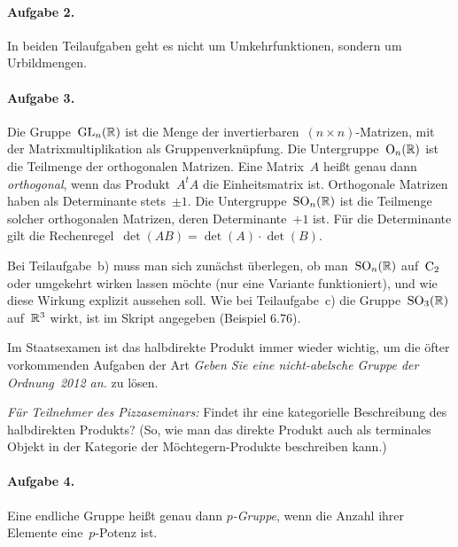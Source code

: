 \documentclass{algblatt}
\newcommand{\hint}[1]{\rotatebox{180}{\vbox{\textcolor{grey}{#1}}}}
\begin{document}
\paragraph{Aufgabe 2.} In beiden Teilaufgaben geht es nicht um
Umkehrfunktionen, sondern um Urbildmengen.

\paragraph{Aufgabe 3.} Die Gruppe~$\mathrm{GL}_n(\mathbb{R})$ ist die Menge der
invertierbaren~$(n \times n)$-Matrizen, mit der Matrixmultiplikation als
Gruppenverknüpfung. Die Untergruppe~$\mathrm{O}_n(\mathbb{R})$ ist die Teilmenge der
orthogonalen Matrizen. Eine Matrix~$A$ heißt genau dann
\emph{orthogonal}, wenn das Produkt~$A^t A$ die
Einheitsmatrix ist. Orthogonale Matrizen haben als Determinante stets~$\pm 1$.
Die Untergruppe~$\mathrm{SO}_n(\mathbb{R})$ ist die Teilmenge solcher
orthogonalen Matrizen, deren Determinante~$+1$ ist. Für die Determinante gilt
die Rechenregel~$\det(AB) = \det(A) \cdot \det(B)$.

Bei Teilaufgabe~b) muss man sich zunächst überlegen, ob man~$\mathrm{SO}_n(\mathbb{R})$
auf~$\mathrm{C}_2$ oder umgekehrt wirken lassen möchte (nur eine Variante
funktioniert), und wie diese Wirkung explizit aussehen soll. Wie bei
Teilaufgabe~c) die Gruppe~$\mathrm{SO}_3(\mathbb{R})$ auf~$\mathbb{R}^3$ wirkt, ist im Skript
angegeben (Beispiel 6.76).

Im Staatsexamen ist das halbdirekte Produkt immer wieder wichtig, um die öfter
vorkommenden Aufgaben der Art \emph{Geben Sie eine nicht-abelsche Gruppe der
Ordnung~2012 an.} zu lösen.

\emph{Für Teilnehmer des Pizzaseminars:} Findet ihr eine kategorielle
Beschreibung des halbdirekten Produkts? (So, wie man das direkte Produkt auch
als terminales Objekt in der Kategorie der Möchtegern-Produkte beschreiben
kann.)

\hint{%
Die Diagonalmatrix, die oben links eine~$-1$ stehen und deren restliche
Diagonaleinträge mit~$+1$ besetzt sind, spielt bei Teilaufgabe~b) eine Rolle.
Wer mich anschreibt, bekommt weitere Tipps.}

\paragraph{Aufgabe 4.} Eine endliche Gruppe heißt genau dann \emph{$p$-Gruppe},
wenn die Anzahl ihrer Elemente eine~$p$-Potenz ist.

\hint{%
Eine nichttriviale~$p$-Gruppe besitzt stets ein Element der Ordnung~$p$ in
ihrem Zentrum. Das Kriterium aus~a) ist für~b) nützlich.}
\end{document}

